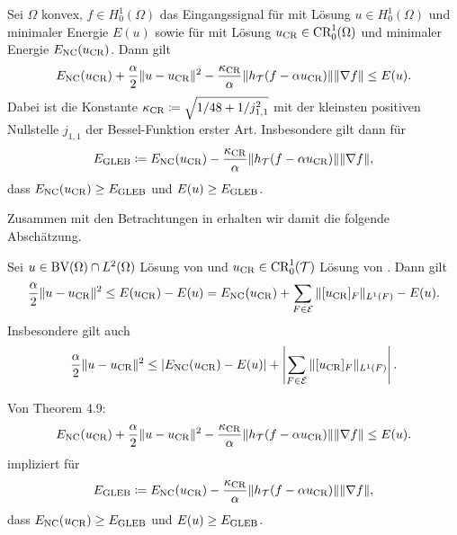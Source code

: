 \begin{theorem}
  \label{thm:gueb}
  Sei $\Omega$ konvex, $f\in H^1_0(\Omega)$ das Eingangssignal für
   mit Lösung $u\in H^1_0(\Omega)$ und minimaler
  Energie $E(u)$ sowie für  mit Lösung $u_\textup{CR}\in
  \textup{CR}^1_0(\Omega)$ und minimaler Energie $E_\textup{NC}(u_\textup{CR})$.
  Dann gilt
  \begin{align*}
    E_\textup{NC}(u_\textup{CR})+\frac{\alpha}{2}\Vert u-u_\textup{CR}\Vert^2
    -\frac{\kappa_{\textup{CR}}}{\alpha}\Vert
    h_{\mathcal{T}}(f-\alpha u_\textup{CR})\Vert \Vert\nabla f\Vert\leq E(u).
  \end{align*}
  Dabei ist die Konstante $\kappa_{\textup{CR}}\coloneqq\sqrt{1/48+1/j_{1,1}^2}$ mit der
  kleinsten positiven Nullstelle $j_{1,1}$ der Bessel-Funktion erster Art.
  Insbesondere gilt dann für 
  \begin{align}
    E_\textup{GLEB} 
    \coloneqq 
    E_\textup{NC}(u_\textup{CR}) - \frac{\kappa_{\textup{CR}}}{\alpha}\Vert h_{\mathcal{T}}(f-\alpha u_\textup{CR})\Vert
    \Vert \nabla f\Vert,
  \end{align}
    dass $E_\textup{NC}(u_\textup{CR})\geq E_\textup{GLEB}$ und $E(u)\geq E_\textup{GLEB}$.

\end{theorem}

Zusammen mit den Betrachtungen in  
erhalten wir damit die folgende Abschätzung.

\begin{corollary}
  Sei $u\in\textup{BV}(\Omega)\cap L^2(\Omega)$ Lösung von
   und $u_\textup{CR}\in\textup{CR}^1_0(\mathcal{T})$ Lösung von
  .
  Dann gilt
  \begin{align*}
    \frac{\alpha}{2}\Vert u-u_\textup{CR}\Vert^2\leq
    E(u_\textup{CR})-E(u)=E_\textup{NC}(u_\textup{CR})+\sum_{F\in\mathcal{E}}\Vert[u_\textup{CR}]_F\Vert_{L^1(F)}-E(u).
  \end{align*}
  Insbesondere gilt auch 
  \begin{align*}
    \frac{\alpha}{2}\Vert u-u_\textup{CR}\Vert^2
    \leq
    \left|E_\textup{NC}(u_\textup{CR})-E(u)\right|+
    \left|\sum_{F\in\mathcal{E}}\Vert[u_\textup{CR}]_F\Vert_{L^1(F)}\right|.
  \end{align*}
\end{corollary}

Von Theorem 4.9:
  \begin{align*}
    E_\textup{NC}(u_\textup{CR})+\frac{\alpha}{2}\Vert u-u_\textup{CR}\Vert^2
    -\frac{\kappa_{\textup{CR}}}{\alpha}\Vert
    h_{\mathcal{T}}(f-\alpha u_\textup{CR})\Vert \Vert\nabla f\Vert\leq E(u).
  \end{align*}
  impliziert für
  \begin{align*}
    E_\textup{GLEB} 
    \coloneqq 
    E_\textup{NC}(u_\textup{CR}) - \frac{\kappa_{\textup{CR}}}{\alpha}\Vert h_{\mathcal{T}}(f-\alpha u_\textup{CR})\Vert
    \Vert \nabla f\Vert,
  \end{align*}
    dass $E_\textup{NC}(u_\textup{CR})\geq E_\textup{GLEB}$ und $E(u)\geq E_\textup{GLEB}$. 


